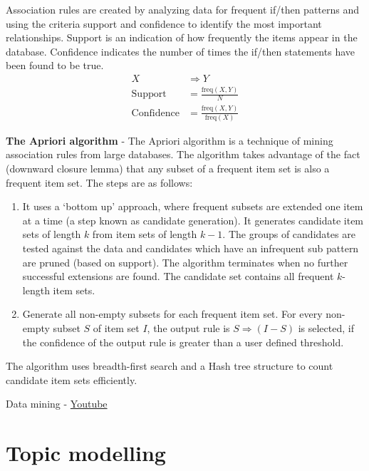 \documentclass{book}
\begin{document}
Association rules are created by analyzing data for frequent if/then patterns and using the criteria support and confidence to identify the most important relationships. Support is an indication of how frequently the items appear in the database. Confidence indicates the number of times the if/then statements have been found to be true.
\begin{align*}
X & \Rightarrow  Y \\
\mbox{Support} &= \frac{\mbox{freq}(X, Y)}{N} \\
\mbox{Confidence} &= \frac{\mbox{freq}(X, Y)}{\mbox{freq}(X)}
\end{align*}

\textbf{The Apriori algorithm} - The Apriori algorithm is a technique of mining association rules from large databases. The algorithm takes advantage of the fact (downward closure lemma) that any subset of a frequent item set is also a frequent item set. The steps are as follows:
\begin{enumerate}
\item It uses a `bottom up' approach, where frequent subsets are extended one item at a time (a step known as candidate generation). It generates candidate item sets of length $k$ from item sets of length $k-1$. The groups of candidates are tested against the data and candidates which have an infrequent sub pattern are pruned (based on support). The algorithm terminates when no further successful extensions are found. The candidate set contains all frequent $k$-length item sets.
\item Generate all non-empty subsets for each frequent item set. For every non-empty subset $S$ of item set $I$, the output rule is $S \Rightarrow (I - S)$ is selected, if the confidence of the output rule is greater than a user defined threshold.
\end{enumerate}


The algorithm uses breadth-first search and a Hash tree structure to count candidate item sets efficiently.

Data mining - \href{https://www.youtube.com/playlist?list=PLea0WJq13cnCS4LLMeUuZmTxqsqlhwUoe}{Youtube}

\chapter{Topic modelling}
\end{document}
